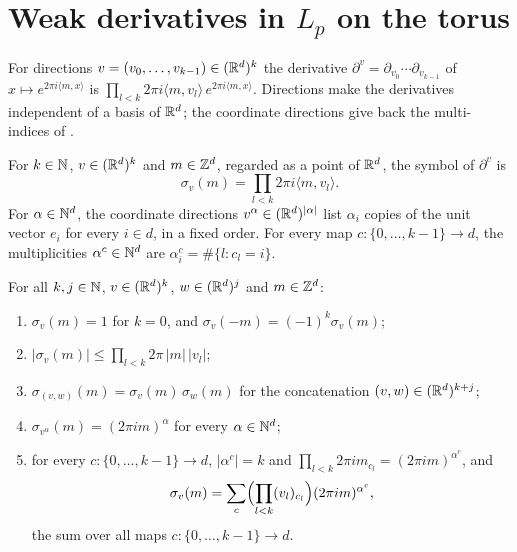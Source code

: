 \section{Weak derivatives in \texorpdfstring{$L_p$}{L\_p} on the torus}
\label{sec:torus-lp-weak-derivatives}

For directions $v = (v_0, \dots, v_{k-1}) \in (\mathbb{R}^d)^k$ the derivative
$\partial^v = \partial_{v_0} \cdots \partial_{v_{k-1}}$ of
$x \mapsto e^{2\pi i \langle m, x \rangle}$ is
$\prod_{l < k} 2\pi i \langle m, v_l \rangle \, e^{2\pi i \langle m, x \rangle}$. Directions
make the derivatives independent of a basis of $\mathbb{R}^d$; the coordinate directions give back the
multi-indices of .

\begin{definition}
\label{def:torus-line-symbol}
\leanok
{}
For $k \in \mathbb{N}$, $v \in (\mathbb{R}^d)^k$ and $m \in \mathbb{Z}^d$, regarded as a point of $\mathbb{R}^d$, the symbol of
$\partial^v$ is
\[
  \sigma_v(m) = \prod_{l < k} 2\pi i \langle m, v_l \rangle .
\]
For $\alpha \in \mathbb{N}^d$, the coordinate directions $v^\alpha \in (\mathbb{R}^d)^{|\alpha|}$ list $\alpha_i$
copies of the unit vector $e_i$ for every $i \in d$, in a fixed order. For every map
$c \colon \{0, \dots, k-1\} \to d$, the multiplicities $\alpha^c \in \mathbb{N}^d$ are
$\alpha^c_i = \#\{l : c_l = i\}$.
\end{definition}

\begin{lemma}[Symbols]
\label{lem:torus-line-symbol}
\leanok
{}
For all $k, j \in \mathbb{N}$, $v \in (\mathbb{R}^d)^k$, $w \in (\mathbb{R}^d)^j$ and $m \in \mathbb{Z}^d$:
\begin{enumerate}
  \item $\sigma_v(m) = 1$ for $k = 0$, and $\sigma_v(-m) = (-1)^k \sigma_v(m)$;
  \item $|\sigma_v(m)| \leq \prod_{l < k} 2\pi \, |m| \, |v_l|$;
  \item $\sigma_{(v, w)}(m) = \sigma_v(m) \, \sigma_w(m)$ for the concatenation
    $(v, w) \in (\mathbb{R}^d)^{k + j}$;
  \item $\sigma_{v^\alpha}(m) = (2\pi i m)^\alpha$ for every $\alpha \in \mathbb{N}^d$;
  \item for every $c \colon \{0, \dots, k-1\} \to d$, $|\alpha^c| = k$ and
    $\prod_{l < k} 2\pi i m_{c_l} = (2\pi i m)^{\alpha^c}$, and
    \[
      \sigma_v(m) = \sum_{c} \Bigl( \prod_{l < k} (v_l)_{c_l} \Bigr) (2\pi i m)^{\alpha^c} ,
    \]
    the sum over all maps $c \colon \{0, \dots, k-1\} \to d$.
\end{enumerate}
\end{lemma}

